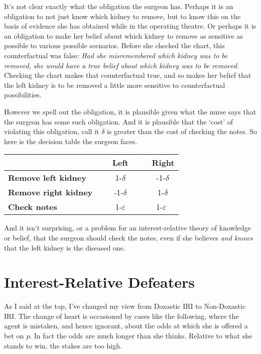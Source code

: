 \documentclass[
  10pt,
  letterpaper,
  DIV=11,
  numbers=noendperiod,
  twoside]{scrartcl}
\begin{document}
It's not clear exactly what the obligation the surgeon has. Perhaps it
is an obligation to not just know which kidney to remove, but to know
this on the basis of evidence she has obtained while in the operating
theatre. Or perhaps it is an obligation to make her belief about which
kidney to remove as sensitive as possible to various possible scenarios.
Before she checked the chart, this counterfactual was false: \emph{Had
she misremembered which kidney was to be removed, she would have a true
belief about which kidney was to be removed.} Checking the chart makes
that counterfactual true, and so makes her belief that the left kidney
is to be removed a little more sensitive to counterfactual
possibilities.

However we spell out the obligation, it is plausible given what the
nurse says that the surgeon has some such obligation. And it is
plausible that the `cost' of violating this obligation, call it
\(\delta\) is greater than the cost of checking the notes. So here is
the decision table the surgeon faces.

\begin{longtable}[]{@{}lcc@{}}
\toprule\noalign{}
~ & ~ \textbf{Left} ~ & ~ \textbf{Right} \\
\midrule\noalign{}
\endhead
\bottomrule\noalign{}
\endlastfoot
\textbf{Remove left kidney} ~ & ~ 1-\(\delta\) ~ & ~ -1-\(\delta\) \\
\textbf{Remove right kidney}~ & ~ -1-\(\delta\) ~ & ~ 1-\(\delta\) \\
\textbf{Check notes} ~ & ~1-\(\varepsilon\)~ & ~1-\(\varepsilon\) \\
\end{longtable}

And it isn't surprising, or a problem for an interest-relative theory of
knowledge or belief, that the surgeon should check the notes, even if
she believes \emph{and knows} that the left kidney is the diseased one.

\section{Interest-Relative Defeaters}\label{sec-3}

As I said at the top, I've changed my view from Doxastic IRI to
Non-Doxastic IRI. The change of heart is occasioned by cases like the
following, where the agent is mistaken, and hence ignorant, about the
odds at which she is offered a bet on \emph{p}. In fact the odds are
much longer than she thinks. Relative to what she stands to win, the
stakes are too high.
\end{document}
